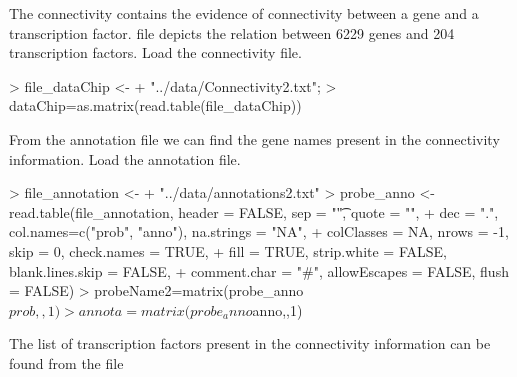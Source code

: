 \documentclass[11pt, a4paper, oneside]{article}
\begin{document}


The connectivity contains the evidence of connectivity between a gene and a transcription factor.  file depicts the relation between 6229 genes and 204 transcription factors.  Load the connectivity file.
\begin{Schunk}
\begin{Sinput}
> file_dataChip <- 
+   "../data/Connectivity2.txt";
> dataChip=as.matrix(read.table(file_dataChip))
\end{Sinput}
\end{Schunk}

From the annotation file we can find the gene names present in the connectivity information. Load the annotation file. %
\begin{Schunk}
\begin{Sinput}
> file_annotation <- 
+   "../data/annotations2.txt"
> probe_anno <- read.table(file_annotation, header = FALSE, sep = "\t", quote = "", 
+                          dec = ".", col.names=c("prob", "anno"), na.strings = "NA", 
+                          colClasses = NA, nrows = -1, skip = 0, check.names = TRUE, 
+                          fill = TRUE, strip.white = FALSE, blank.lines.skip = FALSE, 
+                          comment.char = "#", allowEscapes = FALSE, flush = FALSE)
> probeName2=matrix(probe_anno$prob,,1) 
> annota=matrix(probe_anno$anno,,1)
\end{Sinput}
\end{Schunk}

The list of transcription factors present in the connectivity information can be found from the file %

\begin{Schunk}
\end{Schunk}
\end{document}
